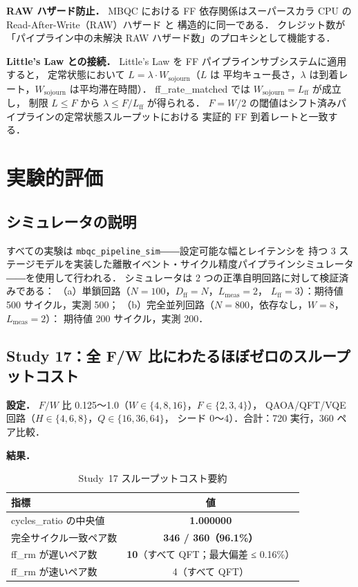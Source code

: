 \documentclass[journal,10pt,twocolumn]{IEEEtran}
\begin{document}
\textbf{RAW ハザード防止．}
MBQC における FF 依存関係はスーパースカラ CPU の
Read-After-Write（RAW）ハザード \cite{HennessyPatterson2017} と
構造的に同一である．
クレジット数が「パイプライン中の未解決 RAW ハザード数」のプロキシとして機能する．

\textbf{Little's Law との接続．}
Little's Law \cite{Little1961} を FF パイプラインサブシステムに適用すると，
定常状態において $L = \lambda \cdot W_{\mathrm{sojourn}}$（$L$ は
平均キュー長さ，$\lambda$ は到着レート，$W_{\mathrm{sojourn}}$ は平均滞在時間）．
ff\_rate\_matched では $W_{\mathrm{sojourn}} = L_{\mathrm{ff}}$ が成立し，
制限 $L \leq F$ から $\lambda \leq F / L_{\mathrm{ff}}$ が得られる．
$F = W/2$ の閾値はシフト済みパイプラインの定常状態スループットにおける
実証的 FF 到着レートと一致する．

\section{実験的評価}

\subsection{シミュレータの説明}

すべての実験は \texttt{mbqc\_pipeline\_sim}――設定可能な幅とレイテンシを
持つ 3 ステージモデルを実装した離散イベント・サイクル精度パイプラインシミュレータ
――を使用して行われる．
シミュレータは 2 つの正準自明回路に対して検証済みである：
（a）単鎖回路（$N=100$，$D_{\mathrm{ff}} = N$，$L_{\mathrm{meas}}=2$，
$L_{\mathrm{ff}}=3$）：期待値 500 サイクル，実測 500；
（b）完全並列回路（$N=800$，依存なし，$W=8$，$L_{\mathrm{meas}}=2$）：
期待値 200 サイクル，実測 200．

\subsection{Study 17：全 F/W 比にわたるほぼゼロのスループットコスト}

\textbf{設定．}
$F/W$ 比 0.125〜1.0（$W \in \{4, 8, 16\}$，$F \in \{2, 3, 4\}$），
QAOA/QFT/VQE 回路（$H \in \{4, 6, 8\}$，$Q \in \{16, 36, 64\}$，
シード 0〜4）．合計：720 実行，360 ペア比較．

\textbf{結果．}
\begin{table}[h]
\centering
\caption{Study~17 スループットコスト要約}
\label{tab:study17}
\begin{tabular}{lc}
\toprule
指標 & 値 \\
\midrule
cycles\_ratio の中央値 & \textbf{1.000000} \\
完全サイクル一致ペア数 & \textbf{346 / 360（96.1\%）} \\
ff\_rm が遅いペア数 & \textbf{10}（すべて QFT；最大偏差 ≤ 0.16\%）\\
ff\_rm が速いペア数 & 4（すべて QFT） \\
\bottomrule
\end{tabular}
\end{table}
\end{document}
